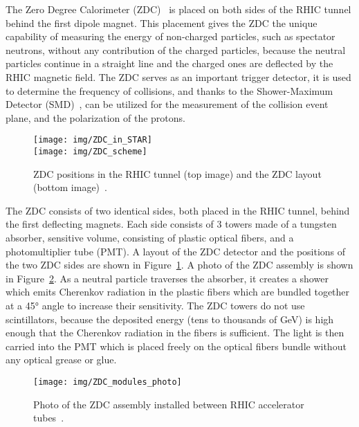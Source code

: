 The Zero Degree Calorimeter (ZDC)~\cite{ZDC} is placed on both sides of the RHIC tunnel behind the first dipole magnet. This placement gives the ZDC the unique capability of measuring the energy of non-charged particles, such as spectator neutrons, without any contribution of the charged particles, because the neutral particles continue in a straight line and the charged ones are deflected by the RHIC magnetic field. The ZDC serves as an important trigger detector, it is used
to determine the frequency of collisions, and thanks to the Shower-Maximum Detector (SMD)~\cite{ZDCSMD}, can be utilized for the measurement of the collision event plane, and the polarization of the protons.

\begin{figure}[!htb]
\begin{center}
  \texttt{[image: img/ZDC\_in\_STAR]}\\
  \texttt{[image: img/ZDC\_scheme]}
\end{center}
\caption[ZDC positions in the RHIC tunnel and the ZDC layout.]{\label{ZDC_scheme}ZDC positions in the RHIC tunnel (top image) and the ZDC layout (bottom image)~\cite{ZDCSMD}. }
\end{figure}


The ZDC consists of two identical sides, both placed in the RHIC tunnel, behind 
the first deflecting magnets. Each side consists of 3 towers made of a tungsten absorber, sensitive volume, consisting of plastic optical fibers, and a photomultiplier tube (PMT)\@. A layout of the ZDC detector and the positions of the two ZDC sides are shown in Figure~\ref{ZDC_scheme}\@. A photo of the ZDC assembly is shown in Figure~\ref{ZDC_photo}\@. As a neutral particle traverses the absorber, it creates a shower which emits Cherenkov radiation in the plastic fibers which are bundled together at a 45° angle to increase their sensitivity. The ZDC towers do not use scintillators, because the deposited energy (tens to thousands of GeV) is high enough that the Cherenkov radiation in the fibers is sufficient. The light is then carried into the PMT which is placed freely on the optical fibers bundle without any optical grease or glue.

\begin{figure}[!htb]
\begin{center}
  \texttt{[image: img/ZDC\_modules\_photo]}
\end{center}
\caption[Photo of the ZDC assembly installed between RHIC accelerator tubes.]{\label{ZDC_photo}Photo of the ZDC assembly installed between RHIC accelerator tubes~\cite{ZDCSMD}. }
\end{figure}

